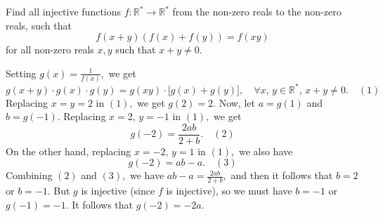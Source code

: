 \begin{solution}
	\begin{tcolorbox}Find all injective functions $f: \mathbb{R}^* \to \mathbb{R}^* $ from the non-zero reals to the non-zero reals, such that \[f(x+y) \left(f(x) + f(y)\right) = f(xy) \] for all non-zero reals $x, y$ such that $x+y \neq 0$.\end{tcolorbox}
Setting $g(x)=\frac{1}{f(x)},$ we get \[g(x+y)\cdot g(x)\cdot g(y)=g(xy)\cdot \big[g(x)+g(y)\big],\quad \forall x ,\,y \in \mathbb R^*,\, x+y \ne 0. \quad (1)\] Replacing $x=y=2$ in $(1),$ we get $g(2)=2.$ Now, let $a=g(1)$ and $b=g({-1}).$ Replacing $x=2,\,y=-1$ in $(1),$ we get \[g({-2})=\frac{2ab}{2+b}.\quad (2)\] On the other hand, replacing $x=-2,\,y=1$ in $(1),$ we also have \[g({-2})=ab-a.\quad (3) \] Combining $(2)$ and $(3),$ we have $ab-a=\frac{2ab}{2+b},$ and then it follows that $b=2$ or $b=-1.$ But $g$ is injective (since $f$ is injective), so we must have $b=-1$ or $g({-1})=-1.$ It follows that $g({-2})=-2a.$


\end{solution}
